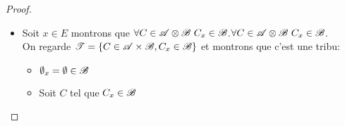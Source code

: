 \begin{proof}
	\begin{itemize}
		\item Soit $x \in E$ montrons que $\forall C \in \triA \xor \triB \ C_x \in \triB$.$\forall C \in \triA \xor \triB \ C_x \in \triB$.\\
		      On regarde $\mathscr{T} = \left\{ C \in \mathscr{A} \times  \mathscr{B} , C_x \in \mathscr{B} \right\}$ et montrons que c'est une tribu:
		      \begin{itemize}
			      \item $\emptyset_x = \emptyset \in \mathscr{B}$
			      \item Soit $C$ tel que $C_x \in \mathscr{B} $ %
		      \end{itemize}

	\end{itemize}
\end{proof}



